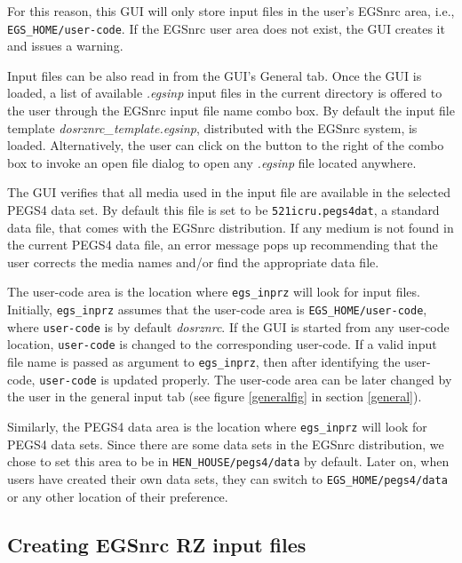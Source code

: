\documentclass[12pt,twoside]{article}   %
\begin{document}
For this reason, this GUI will only store input files in the user's EGSnrc
area, i.e., {\tt EGS\_HOME/user-code}. If the EGSnrc user area does not exist, 
the GUI creates it and issues a warning.

Input files can be also read in from the GUI's General tab. Once the GUI is loaded, 
a list of available {\em *.egsinp} input files in the current directory is offered 
to the user through the EGSnrc input file name combo box. By default the input file 
template {\em dosrznrc\_template.egsinp}, distributed with the EGSnrc system, is loaded.
Alternatively, the user can click on the button to the right of the combo box to 
invoke an open file dialog to open any {\em *.egsinp} file located anywhere.

The GUI verifies that all media used in the input file are available in the selected
PEGS4 data set. By default this file is set to be {\tt 521icru.pegs4dat}, a standard data 
file, that comes with the EGSnrc distribution. If any medium is not found in the 
current PEGS4 data file, an error message pops up recommending that the user corrects the
media names and/or find the appropriate data file.

The user-code area is the location where {\tt egs\_inprz} will look for input files. Initially, 
{\tt egs\_inprz} assumes that the user-code area is {\tt EGS\_HOME/user-code}, where {\tt user-code} 
is by default {\em dosrznrc}. If the GUI is started from any user-code location, {\tt user-code} 
is changed to the corresponding user-code. If a valid input file name is passed as argument to 
{\tt egs\_inprz}, then after identifying the user-code, {\tt user-code} is updated properly. 
The user-code area can 
be later changed by the user in the general input tab (see figure \ref{generalfig} in section 
\ref{general}).

Similarly, the PEGS4 data area is the location where {\tt egs\_inprz} will look for PEGS4 data sets. 
Since
there are some data sets in the EGSnrc distribution, we chose to set this area to be in 
{\tt HEN\_HOUSE/pegs4/data} by default. Later on, when users have created their own data sets, they 
can switch to {\tt EGS\_HOME/pegs4/data} or any other location of their preference.


\subsection{Creating EGSnrc RZ input files}
\label{creating }
\end{document}
